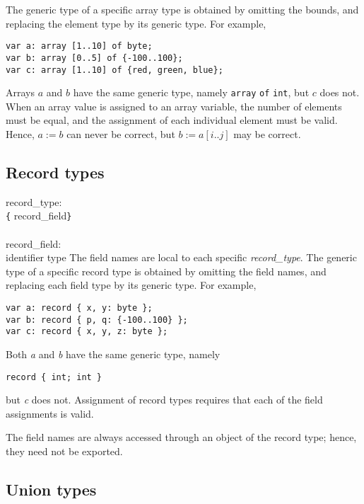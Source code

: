The generic type of a specific array type is obtained by omitting the
bounds, and replacing the element type by its generic type. For example,
\begin{verbatim}
var a: array [1..10] of byte;
var b: array [0..5] of {-100..100};
var c: array [1..10] of {red, green, blue};
\end{verbatim}
Arrays $a$ and $b$ have the same generic type, namely {\tt{}array} {\tt{}of}
{\tt{}int}, but $c$ does not. When an array value is assigned to an
array variable, the number of elements must be equal, and the assignment
of each individual element must be valid. Hence, $a:=b$ can never be
correct, but $b:=a[i..j]$ may be correct.

\subsection{Record types}\label{sec:record}

\grammarstart
record\_type: \\
       \verb|{| record\_field\TSEQ \verb|}| \\
 \\
record\_field: \\
      \>identifier\LIST {\tt{}:} type
\grammarend
The field names are local to each specific {\it{}record\_type}. The
generic type of a specific record type is obtained by omitting the field
names, and replacing each field type by its generic type. For example,
\begin{verbatim}
var a: record { x, y: byte };
var b: record { p, q: {-100..100} };
var c: record { x, y, z: byte };
\end{verbatim}
Both {\it{}a} and {\it{}b} have the same generic type, namely
\begin{verbatim}
record { int; int }
\end{verbatim}
but {\it{}c} does not. Assignment of record types requires that each of the
field assignments is valid.

The field names are always accessed through an object of the record type;
hence, they need not be exported.

\subsection{Union types}\label{sec:union}

